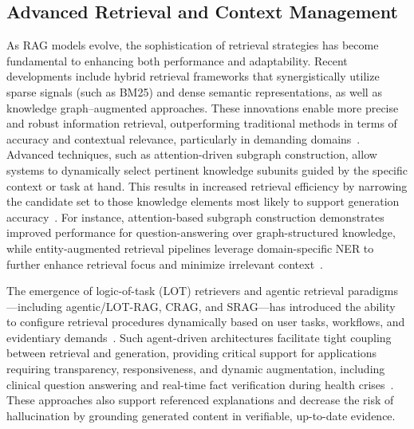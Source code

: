 \documentclass[sigconf]{acmart}
\begin{document}
\subsection{Advanced Retrieval and Context Management}

As RAG models evolve, the sophistication of retrieval strategies has become fundamental to enhancing both performance and adaptability. Recent developments include hybrid retrieval frameworks that synergistically utilize sparse signals (such as BM25) and dense semantic representations, as well as knowledge graph–augmented approaches. These innovations enable more precise and robust information retrieval, outperforming traditional methods in terms of accuracy and contextual relevance, particularly in demanding domains~\cite{ref3, ref8, ref10, ref12, ref29, ref31, ref37, ref47, ref48, ref52, ref54}. Advanced techniques, such as attention-driven subgraph construction, allow systems to dynamically select pertinent knowledge subunits guided by the specific context or task at hand. This results in increased retrieval efficiency by narrowing the candidate set to those knowledge elements most likely to support generation accuracy~\cite{ref47, ref48, ref52}. For instance, attention-based subgraph construction demonstrates improved performance for question-answering over graph-structured knowledge, while entity-augmented retrieval pipelines leverage domain-specific NER to further enhance retrieval focus and minimize irrelevant context~\cite{ref3, ref48, ref52}.

The emergence of logic-of-task (LOT) retrievers and agentic retrieval paradigms—including agentic/LOT-RAG, CRAG, and SRAG—has introduced the ability to configure retrieval procedures dynamically based on user tasks, workflows, and evidentiary demands~\cite{ref54, ref64}. Such agent-driven architectures facilitate tight coupling between retrieval and generation, providing critical support for applications requiring transparency, responsiveness, and dynamic augmentation, including clinical question answering and real-time fact verification during health crises~\cite{ref54, ref64}. These approaches also support referenced explanations and decrease the risk of hallucination by grounding generated content in verifiable, up-to-date evidence.
\end{document}
